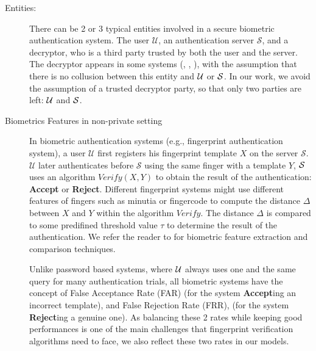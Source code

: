 \begin{description}
\item[Entities:] There can be 2 or 3 typical entities involved in a secure
  biometric authentication system. The user $\mathcal{U}$, an authentication
  server $\mathcal{S}$, and a decryptor, who is a third party trusted by both
  the user and the server. The decryptor appears in some systems
  (\cite{mandal2015comprehensive}, \cite{hirano2013cryptographically},
  \cite{higo2015privacy}), with the assumption that there is no collusion
  between this entity and $\mathcal{U}$ or $\mathcal{S}$. In our work, we avoid the
  assumption of a trusted decryptor party, so that only two parties are left:
  $\mathcal{U}$ and $\mathcal{S}$.
\item[Biometrics Features in non-private setting] In biometric authentication
  systems (e.g., fingerprint authentication system), a user $\mathcal{U}$ first
  registers his fingerprint template $X$ on the server
  $\mathcal{S}$. $\mathcal{U}$ later authenticates before $\mathcal{S}$ using
  the same finger with a template $Y$, $\mathcal{S}$ uses an algorithm $Verify(X,Y)$
  to obtain the result of the authentication: \textbf{Accept} or
  \textbf{Reject}. Different fingerprint systems might use different features of
  fingers such as minutia or fingercode to compute the distance $\Delta$ between
  $X$ and $Y$ within the algorithm $Verify$. The distance $\Delta$ is compared
  to some predifined threshold value $\tau$ to determine the result of the
  authentication. We refer the reader to \cite{jain2007handbook} for biometric
  feature extraction and
  comparison techniques.

  Unlike password based systems, where $\mathcal{U}$ always uses one and the same
  query for many authentication trials, all biometric systems have the concept
  of False Acceptance Rate (FAR) (for the system \textbf{Accept}ing an incorrect
  template), and False Rejection Rate (FRR), (for the system \textbf{Reject}ing
  a genuine one).  As balancing these 2 rates while keeping good performances is
  one of the main challenges that fingerprint verification algorithms
  \cite{FVConGoi2:online} need to face, we also reflect these two rates in our
  models.


\end{description}
